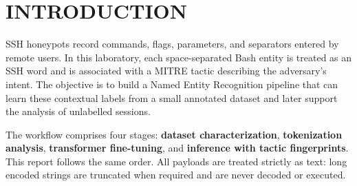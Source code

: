 
\section{INTRODUCTION} \label{sec:introduction}

SSH honeypots record commands, flags, parameters, and separators entered by
remote users. In this laboratory, each space-separated Bash entity is treated
as an SSH word and is associated with a MITRE tactic describing the adversary's
intent. The objective is to build a Named Entity Recognition pipeline that can
learn these contextual labels from a small annotated dataset and later support
the analysis of unlabelled sessions.

The workflow comprises four stages: \textbf{dataset characterization},
\textbf{tokenization analysis}, \textbf{transformer fine-tuning}, and
\textbf{inference with tactic fingerprints}. This report follows the same
order. All payloads are treated strictly as text: long encoded strings are
truncated when required and are never decoded or executed.
